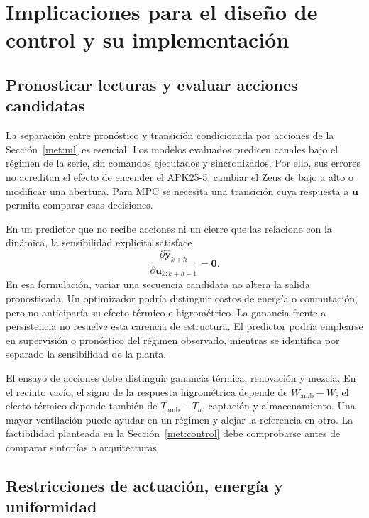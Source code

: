 \section{Implicaciones para el diseño de control y su implementación}
\label{dis:control}

\subsection{Pronosticar lecturas y evaluar acciones candidatas}

La separación entre pronóstico y transición condicionada por acciones de la Sección~\ref{met:ml} es esencial. Los modelos evaluados predicen canales bajo el régimen de la serie, sin comandos ejecutados y sincronizados. Por ello, sus errores no acreditan el efecto de encender el APK25-5, cambiar el Zeus de bajo a alto o modificar una abertura. Para MPC se necesita una transición cuya respuesta a $\mathbf u$ permita comparar esas decisiones.

En un predictor que no recibe acciones ni un cierre que las relacione con la dinámica, la sensibilidad explícita satisface
\begin{equation}
\frac{\partial\widehat{\mathbf y}_{k+h}}{\partial\mathbf u_{k:k+h-1}}
=\mathbf 0.
\label{eq:dis_sensibilidad_accion}
\end{equation}
En esa formulación, variar una secuencia candidata no altera la salida pronosticada. Un optimizador podría distinguir costos de energía o conmutación, pero no anticiparía su efecto térmico e higrométrico. La ganancia frente a persistencia no resuelve esta carencia de estructura. El predictor podría emplearse en supervisión o pronóstico del régimen observado, mientras se identifica por separado la sensibilidad de la planta.

El ensayo de acciones debe distinguir ganancia térmica, renovación y mezcla. En el recinto vacío, el signo de la respuesta higrométrica depende de $W_{\mathrm{amb}}-W$; el efecto térmico depende también de $T_{\mathrm{amb}}-T_a$, captación y almacenamiento. Una mayor ventilación puede ayudar en un régimen y alejar la referencia en otro. La factibilidad planteada en la Sección~\ref{met:control} debe comprobarse antes de comparar sintonías o arquitecturas.

\subsection{Restricciones de actuación, energía y uniformidad}

